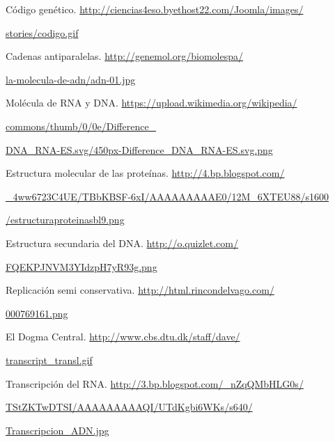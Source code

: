 \documentclass[12pt,a4paper]{report}
\begin{document}
\par [5] Código genético. \url{http://ciencias4eso.byethost22.com/Joomla/images/} 
\par \hspace*{.5cm}\url{stories/codigo.gif}

\par [6] Cadenas antiparalelas. \url{http://genemol.org/biomolespa/}
\par \hspace*{.5cm}\url{la-molecula-de-adn/adn-01.jpg}

\par [7] Molécula de RNA y DNA. \url{https://upload.wikimedia.org/wikipedia/} 
\par \hspace*{.5cm}\url{commons/thumb/0/0e/Difference_}
\par \hspace*{.5cm}\url{DNA_RNA-ES.svg/450px-Difference_DNA_RNA-ES.svg.png}

\par [8] Estructura molecular de las proteínas. \url{http://4.bp.blogspot.com/}
\par \hspace*{.5cm}\url{\_4ww6723C4UE/TBbKBSF-6xI/AAAAAAAAAE0/12M_6XTEU88/s1600}
\par \hspace*{.5cm}\url{/estructuraproteinasbl9.png}

\par [9] Estructura secundaria del DNA. \url{http://o.quizlet.com/}
\par \hspace*{.5cm}\url{FQEKPJNVM3YIdzpH7yR93g.png}
	
\par [10] Replicación semi conservativa. \url{http://html.rincondelvago.com/}
\par \hspace*{.7cm}\url{000769161.png}

\par [11] El Dogma Central. \url{http://www.cbs.dtu.dk/staff/dave/}
\par \hspace*{.7cm}\url{transcript_transl.gif}

\par [12] Transcripción del RNA. \url{http://3.bp.blogspot.com/_nZqQMbHLG0s/}
\par \hspace*{.7cm}\url{TStZKTwDTSI/AAAAAAAAAQI/UTdKgbi6WKs/s640/}
\par \hspace*{.7cm}\url{Transcripcion_ADN.jpg}
\end{document}
